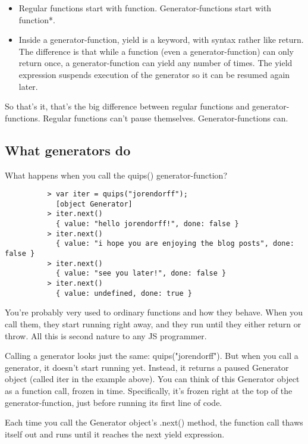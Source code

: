         \begin{itemize}
          \item Regular functions start with function. Generator-functions start with function*.
          \item Inside a generator-function, yield is a keyword, with syntax rather like return. The difference is that while a function (even a generator-function) can only return once, a generator-function can yield any number of times. The yield expression suspends execution of the generator so it can be resumed again later.
        \end{itemize}

        So that's it, that's the big difference between regular functions and generator-functions. Regular functions can't pause themselves. Generator-functions can.

    \subsection{What generators do}
      \label{subsec:what_generators_do}
        What happens when you call the quips() generator-function?

        \begin{lstlisting}
          > var iter = quips("jorendorff");
            [object Generator]
          > iter.next()
            { value: "hello jorendorff!", done: false }
          > iter.next()
            { value: "i hope you are enjoying the blog posts", done: false }
          > iter.next()
            { value: "see you later!", done: false }
          > iter.next()
            { value: undefined, done: true }
        \end{lstlisting}

        You're probably very used to ordinary functions and how they behave. When you call them, they start running right away, and they run until they either return or throw. All this is second nature to any JS programmer.

        Calling a generator looks just the same: quips("jorendorff"). But when you call a generator, it doesn't start running yet. Instead, it returns a paused Generator object (called iter in the example above). You can think of this Generator object as a function call, frozen in time. Specifically, it's frozen right at the top of the generator-function, just before running its first line of code.

        Each time you call the Generator object's .next() method, the function call thaws itself out and runs until it reaches the next yield expression.


